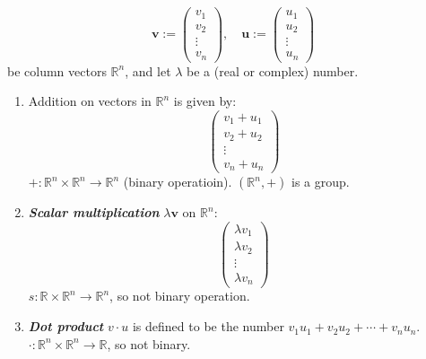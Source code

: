 \documentclass[12pt]{report}
\theoremstyle{definition}
\begin{document}
    \[
        \mathbf{v} := \begin{pmatrix}
                v_1\\
                v_2\\
                \vdots\\
                v_n
        \end{pmatrix}, \quad
        \mathbf{u} := \begin{pmatrix}
                u_1\\
                u_2\\
                \vdots\\
                u_n
            \end{pmatrix}
    \]
    be column vectors $\mathbb{R}^{n}$, and let $\lambda$ be a (real or complex) number.
    \begin{enumerate}[label = (\arabic*)]
        \item Addition on vectors in $\mathbb{R}^{n}$ is given by:\[
                \begin{pmatrix}
                        v_1 + u_1\\
                        v_2 + u_2\\
                        \vdots\\
                        v_n + u_n
                \end{pmatrix}
            \]$+ : \mathbb{R}^{n} \times \mathbb{R}^{n} \rightarrow \mathbb{R}^{n}$ (binary operatioin).
            $(\mathbb{R}^{n}, +)$ is a group.
        \item \textbf{\emph{Scalar multiplication}} $\lambda \mathbf{v}$ on $\mathbb{R}^{n}$:\[
            \begin{pmatrix}
                    \lambda v_1\\
                    \lambda v_2\\
                    \vdots\\
                    \lambda v_n
            \end{pmatrix}
        \]$s : \mathbb{R} \times \mathbb{R}^{n} \rightarrow \mathbb{R}^{n}$, so not binary operation.
    \item \textbf{\emph{Dot product}} $v \cdot u$ is defined to be the number $v_1 u_1 + v_2 u_2 + \cdots + v_n u_n$.
            $\cdot : \mathbb{R}^{n} \times \mathbb{R}^{n} \rightarrow \mathbb{R}$, so not binary.
    \end{enumerate}
\end{document}
